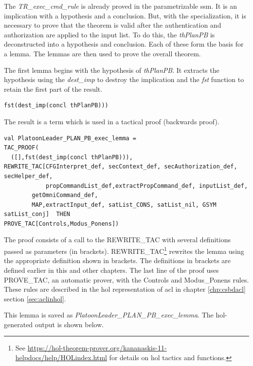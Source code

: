 \documentclass[../../main/main.tex]{subfiles}
\begin{document}
The \textit{TR_exec_cmd_rule} is already proved in the parametrizable ssm. It is an implication with a hypothesis and a conclusion.  But, with the specialization, it is necessary to prove that the theorem is valid after the authentication and authorization are applied to the input list. To do this, the \textit{thPlanPB} is deconstructed into a hypothesis and conclusion.  Each of these form the basis for a lemma.  The lemmas are then used to prove the overall theorem.

The first lemma begins with the hypothesis of \textit{thPlanPB}. It extracts the hypothesis using the \textit{dest_imp} to destroy the implication and the \textit{fst} function to retain the first part of the result.  

\begin{lstlisting}
fst(dest_imp(concl thPlanPB)))
\end{lstlisting}

The result is a  term which is used in a tactical proof (backwards proof).
\begin{lstlisting}
val PlatoonLeader_PLAN_PB_exec_lemma =
TAC_PROOF(
  ([],fst(dest_imp(concl thPlanPB))),
REWRITE_TAC[CFGInterpret_def, secContext_def, secAuthorization_def, secHelper_def,
            propCommandList_def,extractPropCommand_def, inputList_def,
	    getOmniCommand_def,
	    MAP,extractInput_def, satList_CONS, satList_nil, GSYM satList_conj]  THEN
PROVE_TAC[Controls,Modus_Ponens])
\end{lstlisting}

The proof consists of a call to the REWRITE_TAC with several definitions passed as parameters (in brackets).  REWRITE_TAC\footnote{See \url{https://hol-theorem-prover.org/kananaskis-11-helpdocs/help/HOLindex.html} for details on \gls{hol} tactics and functions.} rewrites the lemma using the appropriate definition shown in brackets.  The definitions in brackets are defined earlier in this and other chapters. The last line of the proof uses PROVE_TAC, an automatic prover, with the Controls and Modus_Ponens rules.  These rules are described in the \gls{hol} representation of \gls{acl} in chapter \ref{chp:csbdacl} section \ref{sec:aclinhol}.

This lemma is saved as \textit{PlatoonLeader_PLAN_PB_exec_lemma}.  The \gls{hol}-generated output is shown below.

\HOLssmPBIntegratedTheoremsPlatoonLeaderXXPLANXXPBXXexecXXlemma
\end{document}
